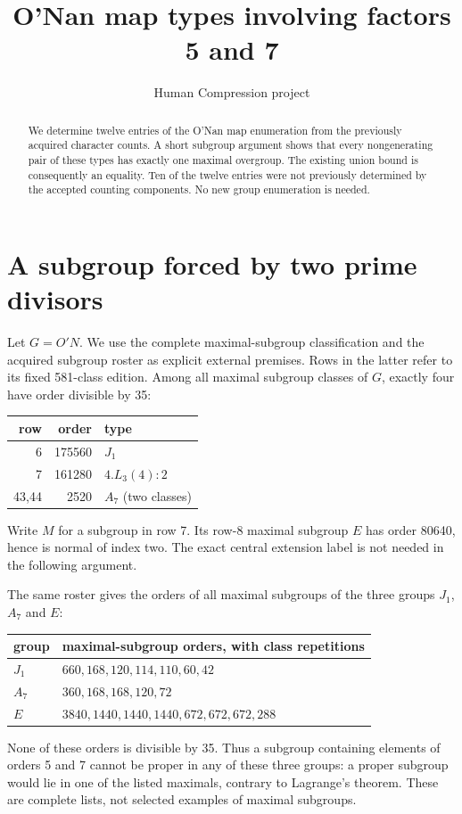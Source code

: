 \documentclass[11pt,a4paper]{article}
\title{O'Nan map types involving factors 5 and 7}
\author{Human Compression project}\date{}
\begin{document}
\maketitle
\begin{abstract}
We determine twelve entries of the O'Nan map enumeration from the
previously acquired character counts. A short subgroup argument shows
that every nongenerating pair of these types has exactly one maximal
overgroup. The existing union bound is consequently an equality.
Ten of the twelve entries were not previously determined by the
accepted counting components. No new group enumeration is needed.
\end{abstract}

\section{A subgroup forced by two prime divisors}
Let $G=O'N$. We use the complete maximal-subgroup classification and
the acquired subgroup roster as explicit external premises. Rows in
the latter refer to its fixed 581-class edition. Among all maximal
subgroup classes of $G$, exactly four have order divisible by 35:
\begin{center}\begin{tabular}{rrl}\toprule
row&order&type\\\midrule
6&175560&$J_1$\\
7&161280&$4.L_3(4):2$\\
43,44&2520&$A_7$ (two classes)\\\bottomrule
\end{tabular}\end{center}
Write $M$ for a subgroup in row 7. Its row-8 maximal subgroup $E$
has order 80640, hence is normal of index two. The exact central
extension label is not needed in the following argument.

The same roster gives the orders of all maximal subgroups of the
three groups $J_1$, $A_7$ and $E$:
\begin{center}\begin{tabular}{ll}\toprule
group&maximal-subgroup orders, with class repetitions\\\midrule
$J_1$&$660,168,120,114,110,60,42$\\
$A_7$&$360,168,168,120,72$\\
$E$&$3840,1440,1440,1440,672,672,672,288$\\\bottomrule
\end{tabular}\end{center}
None of these orders is divisible by 35. Thus a subgroup containing
elements of orders 5 and 7 cannot be proper in any of these three
groups: a proper subgroup would lie in one of the listed maximals,
contrary to Lagrange's theorem. These are complete lists, not selected
examples of maximal subgroups.
\end{document}
